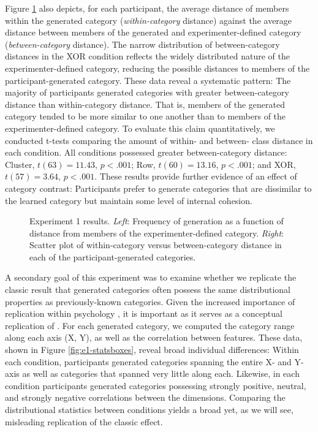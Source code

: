 \documentclass[12pt]{article}
\newcommand\inputpgf[2]{{
\let\pgfimageWithoutPath\pgfimage
\renewcommand{\pgfimage}[2][]{\pgfimageWithoutPath[##1]{#1/##2}}

}}
\begin{document}
\begin{flushleft}
Figure \ref{fig:e1-distanceplots} also depicts, for each participant, the
average distance of members within the generated category ({\em within-category}
distance) against the average distance between members of the generated and
experimenter-defined category ({\em between-category} distance). The narrow
distribution of between-category distances in the XOR condition reflects the
widely distributed nature of the experimenter-defined category, reducing the
possible distances to members of the participant-generated category. These data
reveal a systematic pattern: The majority of participants generated categories
with greater between-category distance than within-category distance. That is,
members of the generated category tended to be more similar to one another than
to members of the experimenter-defined category. To evaluate this claim
quantitatively, we conducted t-tests comparing the amount of within- and
between- class distance in each condition. All conditions possessed greater
between-category distance: Cluster, $t(63) = 11.43$, $p < .001$; Row, $t(60) =
13.16$, $p < .001$; and XOR, $t(57) = 3.64$, $p < .001$. These results provide
further evidence of an effect of category contrast: Participants prefer to
generate categories that are dissimilar to the learned category but maintain
some level of internal cohesion.

\begin{figure}
    \begin{center} \inputpgf{figs/}{e1-distanceplots.pgf}
    \caption{Experiment 1 results. {\em Left}: Frequency of generation as a
function of distance from members of the experimenter-defined category. {\em
Right}: Scatter plot of within-category versus between-category distance in each
of the participant-generated categories.}
    \label{fig:e1-distanceplots}
    \end{center}
\end{figure}

A secondary goal of this experiment was to examine whether we replicate the
classic result that generated categories often possess the same distributional
properties as previously-known categories. Given the increased importance of replication within psychology \citep{zwaan2018making}, it is important as it serves as a conceptual replication of \citet{jern2013probabilistic}. For each generated category, we
computed the category range along each axis (X, Y), as well as the correlation
between features. These data, shown in Figure \ref{fig:e1-statsboxes}, reveal
broad individual differences: Within each condition, participants generated
categories spanning the entire X- and Y- axis as well as categories that spanned
very little along each. Likewise, in each condition participants generated
categories possessing strongly positive, neutral, and strongly negative
correlations between the dimensions. Comparing the distributional statistics
between conditions yields a broad yet, as we will see, misleading replication of
the classic effect.


\end{flushleft}
\end{document}

